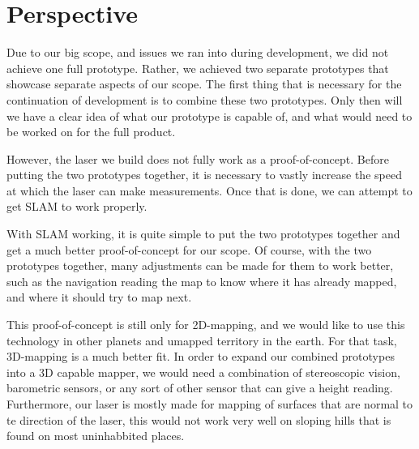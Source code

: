 \section{Perspective}
Due to our big scope, and issues we ran into during development, we did not achieve one full prototype. Rather, we achieved two separate prototypes that showcase separate aspects of our scope. The first thing that is necessary for the continuation of development is to combine these two prototypes. Only then will we have a clear idea of what our prototype is capable of, and what would need to be worked on for the full product.

However, the laser we build does not fully work as a proof-of-concept. Before putting the two prototypes together, it is necessary to vastly increase the speed at which the laser can make measurements. Once that is done, we can attempt to get SLAM to work properly.

With SLAM working, it is quite simple to put the two prototypes together and get a much better proof-of-concept for our scope. Of course, with the two prototypes together, many adjustments can be made for them to work better, such as the navigation reading the map to know where it has already mapped, and where it should try to map next.

This proof-of-concept is still only for 2D-mapping, and we would like to use this technology in other planets and umapped territory in the earth. For that task, 3D-mapping is a much better fit. In order to expand our combined prototypes into a 3D capable mapper, we would need a combination of stereoscopic vision, barometric sensors, or any sort of other sensor that can give a height reading. Furthermore, our laser is mostly made for mapping of surfaces that are normal to te direction of the laser, this would not work very well on sloping hills that is found on most uninhabbited places.





